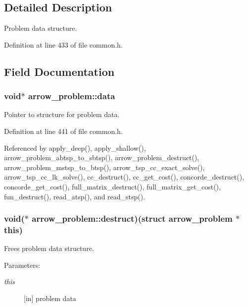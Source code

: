 \subsection{Detailed Description}
Problem data structure. 

Definition at line 433 of file common.h.

\subsection{Field Documentation}
\hypertarget{structarrow__problem_6dbeb0f93e110adf45096c7457cd588d}{
\subsubsection[{data}]{\setlength{\rightskip}{0pt plus 5cm}void$\ast$ {\bf arrow\_\-problem::data}}}
\label{structarrow__problem_6dbeb0f93e110adf45096c7457cd588d}


Pointer to structure for problem data. 

Definition at line 441 of file common.h.

Referenced by apply\_\-deep(), apply\_\-shallow(), arrow\_\-problem\_\-abtsp\_\-to\_\-sbtsp(), arrow\_\-problem\_\-destruct(), arrow\_\-problem\_\-mstsp\_\-to\_\-btsp(), arrow\_\-tsp\_\-cc\_\-exact\_\-solve(), arrow\_\-tsp\_\-cc\_\-lk\_\-solve(), cc\_\-destruct(), cc\_\-get\_\-cost(), concorde\_\-destruct(), concorde\_\-get\_\-cost(), full\_\-matrix\_\-destruct(), full\_\-matrix\_\-get\_\-cost(), fun\_\-destruct(), read\_\-atsp(), and read\_\-stsp().\hypertarget{structarrow__problem_ff7c7873a7e7130a16e2a49da20ee625}{
\subsubsection[{destruct}]{\setlength{\rightskip}{0pt plus 5cm}void($\ast$ {\bf arrow\_\-problem::destruct})(struct {\bf arrow\_\-problem} $\ast$this)}}
\label{structarrow__problem_ff7c7873a7e7130a16e2a49da20ee625}


Frees problem data structure. 

\begin{Desc}
\item[Parameters:]
\begin{description}
\item[{\em this}]\mbox{[}in\mbox{]} problem data \end{description}
\end{Desc}


